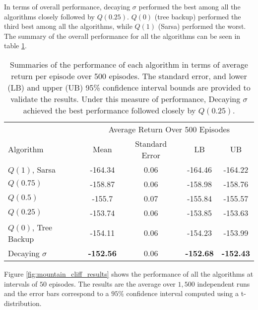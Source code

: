 In terms of overall performance, decaying $\sigma$ performed the best among all the algorithms closely followed by $Q(0.25)$.
$Q(0)$ (tree backup) performed the third best among all the algorithms, while $Q(1)$ (Sarsa) performed the worst.
The summary of the overall performance for all the algorithms can be seen in table \ref{tbl:mountain_cliff_total_results}.

\begin{table}[t] 
\caption[Experiment Results in the Mountain Cliff Environment in Terms of Average Return After 500 Episodes]{Summaries of the performance of each algorithm in terms of average return per episode over 500 episodes. 
The standard error, and lower (LB) and upper (UB) 95\% confidence interval bounds are provided to validate the results.
Under this measure of performance, Decaying $\sigma$ achieved the best performance followed closely by $Q(0.25)$.
}
\label{tbl:mountain_cliff_total_results}
\begin{center}
\begin{tabular}{lcccc}
\toprule
& \multicolumn{4}{c}{Average Return Over 500 Episodes} \\
\cmidrule{2-5}
Algorithm & Mean & Standard Error & LB & UB \\
\midrule
$Q(1)$, Sarsa 		& -164.34	        & 0.06	& -164.46	        & -164.22   \\           
$Q(0.75)$  			& -158.87	        & 0.06	& -158.98	        & -158.76   \\
$Q(0.5)$  			& -155.7	        & 0.07	& -155.84	        & -155.57   \\
$Q(0.25)$  			& -153.74	        & 0.06	& -153.85	        & -153.63   \\
$Q(0)$, Tree Backup & -154.11	        & 0.06	& -154.23	        & -153.99   \\
Decaying $\sigma$ 	& \textbf{-152.56}	& 0.06	& \textbf{-152.68}	& \textbf{-152.43}   \\
\bottomrule
\end{tabular}
\end{center}
\end{table}

Figure \ref{fig:mountain_cliff_results} shows the performance of all the algorithms at intervals of $50$ episodes.
The results are the average over $1,500$ independent runs and the error bars correspond to a $95\%$ confidence interval computed using a t-distribution.

